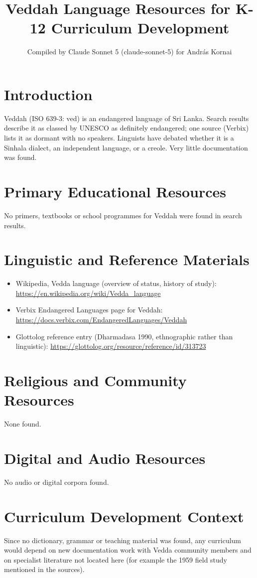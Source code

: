 \documentclass[12pt]{article}
\title{Veddah Language Resources for K-12 Curriculum Development}
\author{Compiled by Claude Sonnet 5 (claude-sonnet-5) for Andr\'as Kornai}
\date{}
\begin{document}
\maketitle
\section{Introduction}
Veddah (ISO 639-3: ved) is an endangered language of Sri Lanka. Search results describe it as classed by UNESCO as definitely endangered; one source (Verbix) lists it as dormant with no speakers. Linguists have debated whether it is a Sinhala dialect, an independent language, or a creole. Very little documentation was found.
\section{Primary Educational Resources}
No primers, textbooks or school programmes for Veddah were found in search results.
\section{Linguistic and Reference Materials}
\begin{itemize}
\item Wikipedia, Vedda language (overview of status, history of study): \url{https://en.wikipedia.org/wiki/Vedda_language}
\item Verbix Endangered Languages page for Veddah: \url{https://docs.verbix.com/EndangeredLanguages/Veddah}
\item Glottolog reference entry (Dharmadasa 1990, ethnographic rather than linguistic): \url{https://glottolog.org/resource/reference/id/313723}
\end{itemize}
\section{Religious and Community Resources}
None found.
\section{Digital and Audio Resources}
No audio or digital corpora found.
\section{Curriculum Development Context}
Since no dictionary, grammar or teaching material was found, any curriculum would depend on new documentation work with Vedda community members and on specialist literature not located here (for example the 1959 field study mentioned in the sources).
\end{document}
